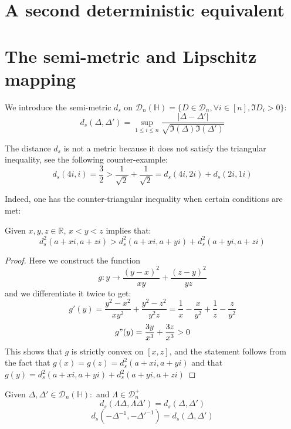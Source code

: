 \documentclass[ECP, preprint]{ejpecp} %
\begin{document}
\section{A second deterministic equivalent}
\appendix
\section{The semi-metric and Lipschitz mapping}
We introduce the semi-metric $d_s$ on $\mathcal{D}_n(\mathbb{H})=\{D\in \mathcal{D}_n,\forall i \in [n],\Im{D}_i>0\}$:
$$d_s(\Delta,\Delta')=\sup_{1\leq i\leq n}\frac{|\Delta-\Delta'|}{\sqrt{\Im(\Delta)\Im(\Delta')}}$$

The distance $d_s$ is not a metric because it does not satisfy the triangular inequality, see the following counter-example:
$$d_s(4i,i)=\frac{3}{2}>\frac{1}{\sqrt{2}}+\frac{1}{\sqrt{2}}=d_s(4i,2i)+d_s(2i,1i)$$

Indeed, one has the counter-triangular inequality when certain conditions are met:
\begin{lemma}
    Given $x,y,z\in \mathbb{R}$, $x<y<z$ implies that:
    $$d^2_s(a+xi,a+zi)>d^2_s(a+xi,a+yi)+d^2_s(a+yi,a+zi)$$
\end{lemma}
\begin{proof}
    Here we construct the function
    $$g:y\to \frac{(y-x)^2}{xy}+\frac{(z-y)^2}{yz}$$
and we differentiate it twice to get:
$$g'(y)=\frac{y^2-x^2}{xy^2}+\frac{y^2-z^2}{y^2z}=\frac{1}{x}-\frac{x}{y^2}+\frac{1}{z}-\frac{z}{y^2}$$
$$g"(y)=\frac{3y}{x^3}+\frac{3z}{x^3}>0$$
This shows that $g$ is strictly convex on $[x,z]$, and the statement follows from the fact that $g(x)=g(z)=d^2_s(a+xi,a+yi)$ and that $g(y)=d^2_s(a+xi,a+yi)+d^2_s(a+yi,a+zi)$
\end{proof}




\begin{lemma}
    Given $\Delta,\Delta'\in \mathcal{D}_n(\mathbb{H}):$ and $\Lambda\in \mathcal{D}^+_n$
    $$d_s(\Lambda\Delta,\Lambda\Delta')=d_s(\Delta,\Delta')$$ 
    $$d_s(-\Delta^{-1},-\Delta'^{-1})=d_s(\Delta,\Delta')$$
\end{lemma}
\end{document}
